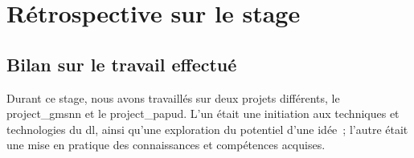 







\chapter{Rétrospective sur le stage}
\section{Bilan sur le travail effectué}
Durant ce stage, nous avons travaillés sur deux projets différents, le \gls{project_gmsnn} et le \gls{project_papud}.
L'un était une initiation aux techniques et technologies du \gls{dl}, ainsi qu'une exploration du potentiel d'une idée~; l'autre était une mise en pratique des connaissances et compétences acquises.

